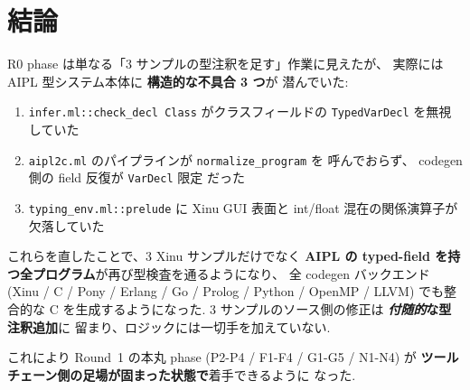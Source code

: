 \documentclass[11pt,a4paper]{article}
\begin{document}
\section{結論}

R0 phase は単なる「3 サンプルの型注釈を足す」作業に見えたが、
実際には AIPL 型システム本体に\textbf{ 構造的な不具合 3 つ}が
潜んでいた:

\begin{enumerate}[label=(\arabic*)]
  \item \texttt{infer.ml::check\_decl Class} がクラスフィールドの
        \texttt{TypedVarDecl} を無視していた
  \item \texttt{aipl2c.ml} のパイプラインが \texttt{normalize\_program} を
        呼んでおらず、 codegen 側の field 反復が \texttt{VarDecl} 限定
        だった
  \item \texttt{typing\_env.ml::prelude} に Xinu GUI 表面と
        int/float 混在の関係演算子が欠落していた
\end{enumerate}

これらを直したことで、3 Xinu サンプルだけでなく\textbf{ AIPL の
typed-field を持つ全プログラム}が再び型検査を通るようになり、
全 codegen バックエンド (Xinu / C / Pony / Erlang / Go / Prolog /
Python / OpenMP / LLVM) でも整合的な C を生成するようになった.
3 サンプルのソース側の修正は\textbf{ \emph{付随的}な型注釈追加}に
留まり、ロジックには一切手を加えていない.

\medskip

\noindent
これにより Round~1 の本丸 phase (P2-P4 / F1-F4 / G1-G5 / N1-N4) が
\textbf{ ツールチェーン側の足場が固まった状態で}着手できるように
なった.
\end{document}

